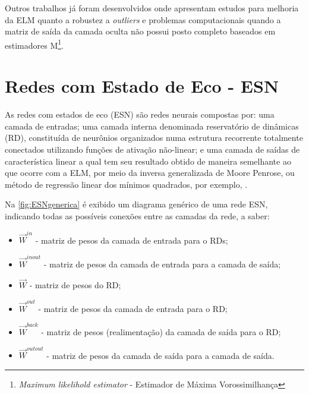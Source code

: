 
Outros trabalhos já foram desenvolvidos onde apresentam estudos para melhoria da ELM quanto a robustez a \textit{outliers} e problemas computacionais quando a matriz de saída da camada oculta não possui posto completo \cite{horata2013} baseados em estimadores M\footnote{\textit{Maximum likelihold estimator} - Estimador de Máxima Vorossimilhança}.


\section{Redes com Estado de Eco - ESN}\label{sec:ESN}

As redes com estados de eco (ESN) são redes neurais compostas por: uma camada de entradas; uma camada interna denominada reservatório de dinâmicas (RD), constituída de neurônios organizados numa estrutura recorrente totalmente conectados utilizando funções de ativação não-linear; e uma camada de saídas de característica linear a qual tem seu resultado obtido de maneira semelhante ao que ocorre com a ELM, por meio da inversa generalizada de Moore Penrose, ou método de regressão linear dos mínimos quadrados, por exemplo, \cite{jaeger2001}.

Na \autoref{fig:ESNgenerica} é exibido um diagrama genérico de uma rede ESN, indicando todas as possíveis conexões entre as camadas da rede, a saber:

\begin{itemize}
	\item $\vec{W}^{in}$ - matriz de pesos da camada de entrada para o RDs;
	\item $\vec{W}^{inout}$ - matriz de pesos da camada de entrada para a camada de saída;
	\item $\vec{W}$ - matriz de pesos do RD;
	\item $\vec{W}^{out}$ - matriz de pesos da camada de entrada para o RD;
	\item $\vec{W}^{back}$ - matriz de pesos (realimentação) da camada de saída para o RD;
	\item $\vec{W}^{outout}$ - matriz de pesos da camada de saída para a camada de saída.
\end{itemize}


